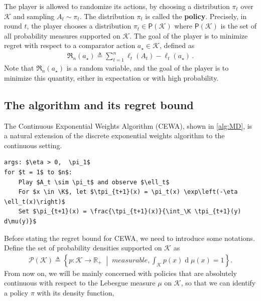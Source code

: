 \documentclass{article}
\theoremstyle{plain}
\theoremstyle{definition}
\theoremstyle{plain}
\newcommand{\R}{\mathbb R}
\newcommand{\Reg}{\mathfrak{R}}
\newcommand{\K}{\mathcal K}
\newcommand{\cP}{\mathcal P}
\renewcommand{\d}[1]{\operatorname{d}\!#1}
\newcommand{\tpi}{\tilde{\pi}}
\newcommand{\cewaalg}{\textsf{CEWA}\xspace}
\begin{document}
The player is allowed to randomize its actions, by choosing a distribution $\pi_t$ over $\K$ and sampling $A_t \sim \pi_t$.
The distribution $\pi_t$ is called the \textbf{policy}.
Precisely, in round $t$, the player chooses a distribution $\pi_t \in \mathsf{P}(\K)$ where
$\mathsf{P}(\K)$ is the set of all probability measures supported on $\K$.
The goal of the player is to minimize regret with respect to a comparator action $a_\star \in \K$, defined as
\begin{align}
    \Reg_n(a_\star) \triangleq \sum_{t=1}^{n} \ell_t(A_t) - \ell_t(a_\star)\,.
\end{align}
Note that $\Reg_n(a_\star)$ is a random variable,
and the goal of the player is to minimize this quantity, either in expectation or with high probability.

\subsection{The algorithm and its regret bound}
The Continuous Exponential Weights Algorithm (\cewaalg), shown in \cref{alg:MD},
is a natural extension of the discrete exponential weights algorithm to the continuous setting.
\begin{algorithm}[H]
    \begin{minipage}{12cm}
        \begin{mdframed}
            \begin{lstlisting}
args: $\eta > 0,  \pi_1$
for $t = 1$ to $n$:
    Play $A_t \sim \pi_t$ and observe $\ell_t$
    For $x \in \K$, let $\tpi_{t+1}(x) = \pi_t(x) \exp\left(-\eta \ell_t(x)\right)$
    Set $\pi_{t+1}(x) = \frac{\tpi_{t+1}(x)}{\int_\K \tpi_{t+1}(y) d\mu(y)}$
\end{lstlisting}
            \caption{
                \cewaalg algorithm.
            }\label{alg:MD}
        \end{mdframed}
    \end{minipage}
\end{algorithm}
\noindent
Before stating the regret bound for \cewaalg, we need to introduce some notations.
Define the set of probability densities supported on $\K$ as
\begin{align}
    \cP(\K)
    \triangleq
    \left\{
    p:\K\to\R_+
    \;\middle|\;
    \textit{measurable}, \int_\K p(x)\d\mu(x)=1
    \right\}.
\end{align}
From now on, we will be mainly concerned with policies that are absolutely continuous with respect to the Lebesgue measure $\mu$ on $\K$, so that we can identify a policy $\pi$ with its density function,
\end{document}
